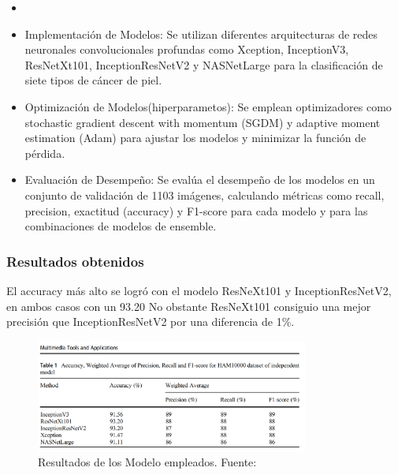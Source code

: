 \newcommand{\TUAMCtwo}{Implementación de Modelos: Se utilizan diferentes arquitecturas de redes neuronales convolucionales profundas como Xception, InceptionV3, ResNetXt101, InceptionResNetV2 y NASNetLarge para la clasificación de siete tipos de cáncer de piel. }

\newcommand{\TUAMCthree}{Optimización de Modelos(hiperparametos): Se emplean optimizadores como stochastic gradient descent with momentum (SGDM) y adaptive moment estimation (Adam) para ajustar los modelos y minimizar la función de pérdida.
}


\newcommand{\TUAMCfour}{Evaluación de Desempeño: Se evalúa el desempeño de los modelos en un conjunto de validación de 1103 imágenes, calculando métricas como recall, precision, exactitud (accuracy) y F1-score para cada modelo y para las combinaciones de modelos de ensemble.
	
}

\begin{itemize}
	\item \TUAMCone
	\item \TUAMCtwo
	\item \TUAMCthree
	\item \TUAMCfour
\end{itemize}

\subsubsection{Resultados obtenidos}

El accuracy más alto se logró con el modelo ResNeXt101 y InceptionResNetV2, en ambos casos con un 93.20%
No obstante ResNeXt101 consiguio una mejor precisión que InceptionResNetV2 por una diferencia de 1\%.

\begin{figure}[h]
	\begin{center}
		\includegraphics[width=0.8\textwidth]{2/figuras/An_improved_network_skin_cancer_classification_imagen_01.png}
		\caption{Resultados de los Modelo empleados. Fuente: \cite{chaturvedi2020multi}}
		\label{1:fig 14}
	\end{center}
\end{figure}





